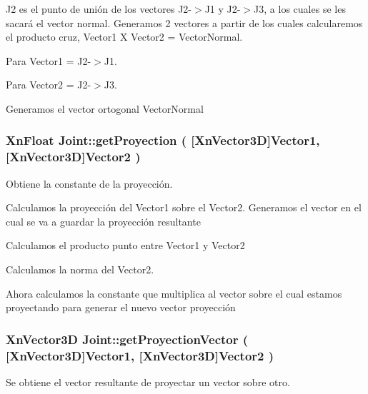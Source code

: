 \-J2 es el punto de unión de los vectores \-J2-\/$>$\-J1 y \-J2-\/$>$\-J3, a los cuales se les sacará el vector normal. \-Generamos 2 vectores a partir de los cuales calcularemos el producto cruz, \-Vector1 \-X \-Vector2 = \-Vector\-Normal.

\-Para \-Vector1 = \-J2-\/$>$\-J1.

\-Para \-Vector2 = \-J2-\/$>$\-J3.

\-Generamos el vector ortogonal \-Vector\-Normal \hypertarget{class_joint_a06ed69732a17f61fa6ce9fa5ba2541ea}{
\subsubsection[{get\-Proyection}]{\setlength{\rightskip}{0pt plus 5cm}\-Xn\-Float {\bf \-Joint\-::get\-Proyection} (
[{\-Xn\-Vector3\-D}]{\-Vector1, }
[{\-Xn\-Vector3\-D}]{\-Vector2}
)}}\label{class_joint_a06ed69732a17f61fa6ce9fa5ba2541ea}


\-Obtiene la constante de la proyección. 

\-Calculamos la proyección del \-Vector1 sobre el \-Vector2. \-Generamos el vector en el cual se va a guardar la proyección resultante

\-Calculamos el producto punto entre \-Vector1 y \-Vector2

\-Calculamos la norma del \-Vector2.

\-Ahora calculamos la constante que multiplica al vector sobre el cual estamos proyectando para generar el nuevo vector proyección \hypertarget{class_joint_af5590ba3d5bfc4e27a43036a1d394629}{
\subsubsection[{get\-Proyection\-Vector}]{\setlength{\rightskip}{0pt plus 5cm}\-Xn\-Vector3\-D {\bf \-Joint\-::get\-Proyection\-Vector} (
[{\-Xn\-Vector3\-D}]{\-Vector1, }
[{\-Xn\-Vector3\-D}]{\-Vector2}
)}}\label{class_joint_af5590ba3d5bfc4e27a43036a1d394629}


\-Se obtiene el vector resultante de proyectar un vector sobre otro. 

